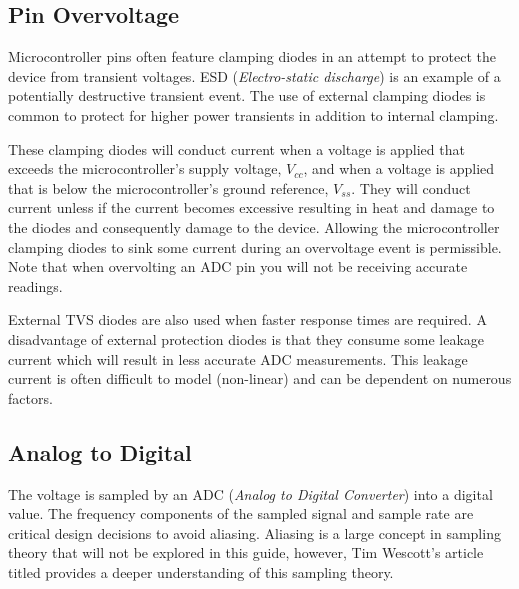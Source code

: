 \documentclass[main.tex]{subfiles}
\begin{document}
\subsection{Pin Overvoltage}
Microcontroller pins often feature clamping diodes in an attempt to protect the device from transient voltages. ESD (\textit{Electro-static discharge}) is an example of a potentially destructive transient event. The use of external clamping diodes is common to protect for higher power transients in addition to internal clamping. \newline


\noindent These clamping diodes will conduct current when a voltage is applied that exceeds the microcontroller's supply voltage, $V_{cc}$, and when a voltage is applied that is below the microcontroller's ground reference, $V_{ss}$. They will conduct current unless if the current becomes excessive resulting in heat and damage to the diodes and consequently damage to the device. Allowing the microcontroller clamping diodes to sink some current during an overvoltage event is permissible. Note that when overvolting an ADC pin you will not be receiving accurate readings. \newline

\newnoindentpara External TVS diodes are also used when faster response times are required. A disadvantage of external protection diodes is that they consume some leakage current which will result in less accurate ADC measurements. This leakage current is often difficult to model (non-linear) and can be dependent on numerous factors.

\subsection{Analog to Digital}
The voltage is sampled by an ADC (\textit{Analog to Digital Converter}) into a digital value. The frequency components of the sampled signal and sample rate are critical design decisions to avoid aliasing. Aliasing is a large concept in sampling theory that will not be explored in this guide, however, Tim Wescott's article titled  provides a deeper understanding of this sampling theory. \newline
\end{document}

